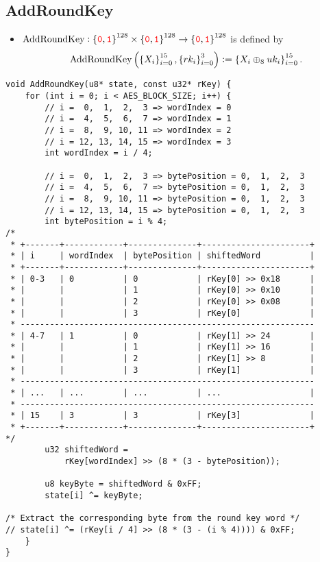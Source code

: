 \subsection{AddRoundKey}
\begin{itemize}
	\item $\text{AddRoundKey}:\set{\textcolor{red}{\texttt{0}},\textcolor{red}{\texttt{1}}}^{128}\times\set{\textcolor{red}{\texttt{0}},\textcolor{red}{\texttt{1}}}^{128}\to\set{\textcolor{red}{\texttt{0}},\textcolor{red}{\texttt{1}}}^{128}$ is defined by \[
	\text{AddRoundKey}\left(\set{X_i}_{i=0}^{15},\set{rk_i}_{i=0}^{3}\right):=\set{X_i\oplus_{8} uk_i}_{i=0}^{15}.
	\] 
\end{itemize}
\begin{lstlisting}[style=C, caption={AES AddRoundKey},captionpos=t]
void AddRoundKey(u8* state, const u32* rKey) {
	for (int i = 0; i < AES_BLOCK_SIZE; i++) {
		// i =  0,  1,  2,  3 => wordIndex = 0
		// i =  4,  5,  6,  7 => wordIndex = 1
		// i =  8,  9, 10, 11 => wordIndex = 2
		// i = 12, 13, 14, 15 => wordIndex = 3 
		int wordIndex = i / 4;
		
		// i =  0,  1,  2,  3 => bytePosition = 0,  1,  2,  3
		// i =  4,  5,  6,  7 => bytePosition = 0,  1,  2,  3
		// i =  8,  9, 10, 11 => bytePosition = 0,  1,  2,  3
		// i = 12, 13, 14, 15 => bytePosition = 0,  1,  2,  3 
		int bytePosition = i % 4;
/* 
 * +-------+------------+--------------+----------------------+
 * | i     | wordIndex  | bytePosition | shiftedWord          |
 * +-------+------------+--------------+----------------------+
 * | 0-3   | 0          | 0            | rKey[0] >> 0x18      |
 * |       |            | 1            | rKey[0] >> 0x10      |
 * |       |            | 2            | rKey[0] >> 0x08      |
 * |       |            | 3            | rKey[0]              |
 * ------------------------------------------------------------
 * | 4-7   | 1          | 0            | rKey[1] >> 24        |
 * |       |            | 1            | rKey[1] >> 16        |
 * |       |            | 2            | rKey[1] >> 8         |
 * |       |            | 3            | rKey[1]              |
 * ------------------------------------------------------------
 * | ...   | ...        | ...          | ...                  |
 * ------------------------------------------------------------
 * | 15    | 3          | 3            | rKey[3]              |
 * +-------+------------+--------------+----------------------+
*/
		u32 shiftedWord =
			rKey[wordIndex] >> (8 * (3 - bytePosition));
		
		u8 keyByte = shiftedWord & 0xFF;
		state[i] ^= keyByte;
		
/* Extract the corresponding byte from the round key word */
// state[i] ^= (rKey[i / 4] >> (8 * (3 - (i % 4)))) & 0xFF;
	}
}
\end{lstlisting}

